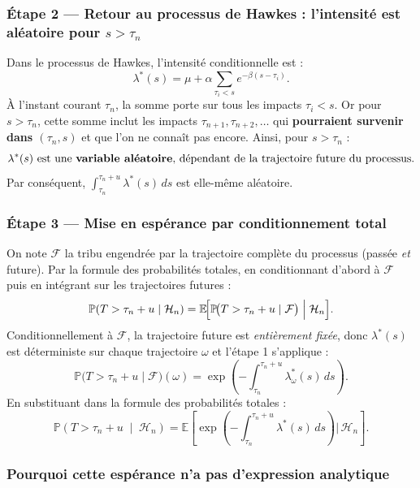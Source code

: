 \documentclass[a4paper,11pt]{article}
\begin{document}
\subsubsection*{Étape 2 — Retour au processus de Hawkes : l'intensité
est aléatoire pour $s > \tau_n$}

Dans le processus de Hawkes, l'intensité conditionnelle est :
\[
    \lambda^*(s)
    = \mu + \alpha \sum_{\tau_i < s} e^{-\beta(s - \tau_i)}.
\]
À l'instant courant $\tau_n$, la somme porte sur tous les impacts
$\tau_i < s$. Or pour $s > \tau_n$, cette somme inclut les impacts
$\tau_{n+1}, \tau_{n+2}, \ldots$ qui \textbf{pourraient survenir dans
$(\tau_n, s)$} et que l'on ne connaît pas encore. Ainsi, pour
$s > \tau_n$ :
\[
    \lambda^*(s) \text{ est une \textbf{variable aléatoire},
    dépendant de la trajectoire future du processus.}
\]
Par conséquent, $\int_{\tau_n}^{\tau_n+u} \lambda^*(s)\,ds$ est
elle-même aléatoire.

\subsubsection*{Étape 3 — Mise en espérance par conditionnement total}

On note $\mathcal{F}$ la tribu engendrée par la trajectoire complète
du processus (passée \emph{et} future). Par la formule des
probabilités totales, en conditionnant d'abord à $\mathcal{F}$ puis
en intégrant sur les trajectoires futures :
\[
    \mathbb{P}(T > \tau_n + u \mid \mathcal{H}_n)
    = \mathbb{E}\!\Bigl[
        \mathbb{P}\!\bigl(T > \tau_n + u \mid \mathcal{F}\bigr)
      \;\Big|\; \mathcal{H}_n
    \Bigr].
\]
Conditionnellement à $\mathcal{F}$, la trajectoire future est
\emph{entièrement fixée}, donc $\lambda^*(s)$ est déterministe
sur chaque trajectoire $\omega$ et l'étape 1 s'applique :
\[
    \mathbb{P}\!\bigl(T > \tau_n + u \mid \mathcal{F}\bigr)(\omega)
    = \exp\!\left(
        -\int_{\tau_n}^{\tau_n+u} \lambda^*_\omega(s)\,ds
      \right).
\]
En substituant dans la formule des probabilités totales :
\[
\boxed{
    \mathbb{P}\!\left(T > \tau_n + u \;\middle|\; \mathcal{H}_n\right)
    = \mathbb{E}\!\left[
        \exp\!\left(
          -\int_{\tau_n}^{\tau_n+u} \lambda^*(s)\,ds
        \right)
      \Bigg|\, \mathcal{H}_n
    \right].
}
\]

\subsubsection*{Pourquoi cette espérance n'a pas d'expression
analytique}
\end{document}
